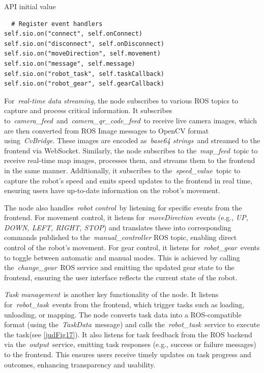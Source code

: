 \documentclass[../../main]{subfiles}
\begin{document}
\begin{codebox}[label=judFig17]{API initial value}
  \begin{verbatim}
  # Register event handlers
self.sio.on("connect", self.onConnect)
self.sio.on("disconnect", self.onDisconnect)
self.sio.on("moveDirection", self.movement)
self.sio.on("message", self.message)
self.sio.on("robot_task", self.taskCallback)
self.sio.on("robot_gear", self.gearCallback)
\end{verbatim}
\end{codebox}

For~\emph{real-time data streaming}, the node subscribes to various ROS
topics to capture and process critical information. It subscribes
to~\emph{camera\_feed}~and~\emph{camera\_qr\_code\_feed}~to receive live
camera images, which are then converted from ROS Image messages to
OpenCV format using~\emph{CvBridge}. These images are encoded
as~\emph{base64 strings}~and streamed to the frontend via WebSocket.
Similarly, the node subscribes to the~\emph{map\_feed}~topic to receive
real-time map images, processes them, and streams them to the frontend
in the same manner. Additionally, it subscribes to
the~\emph{speed\_value}~topic to capture the robot's speed and emits
speed updates to the frontend in real time, ensuring users have
up-to-date information on the robot's movement.

The node also handles~\emph{robot control}~by listening for specific
events from the frontend. For movement control, it listens
for~\emph{moveDirection}~events (e.g., \emph{UP, DOWN, LEFT, RIGHT,
STOP}) and translates these into corresponding commands published to
the~\emph{manual\_controller} ROS topic, enabling direct control of the
robot's movement. For gear control, it listens
for~\emph{robot\_gear}~events to toggle between automatic and manual
modes. This is achieved by calling the~\emph{change\_gear}~ROS service
and emitting the updated gear state to the frontend, ensuring the user
interface reflects the current state of the robot.

\emph{Task management}~is another key functionality of the node. It
listens for~\emph{robot\_task}~events from the frontend, which trigger
tasks such as loading, unloading, or mapping. The node converts task
data into a ROS-compatible format (using the~\emph{TaskData}~message)
and calls the~\emph{robot\_task}~service to execute the task(see \cref{judFig17}). It also listens for task feedback from the ROS backend via
the~\emph{output}~service, emitting task responses (e.g., success or
failure messages) to the frontend. This ensures users receive timely
updates on task progress and outcomes, enhancing transparency and
usability.
\end{document}
